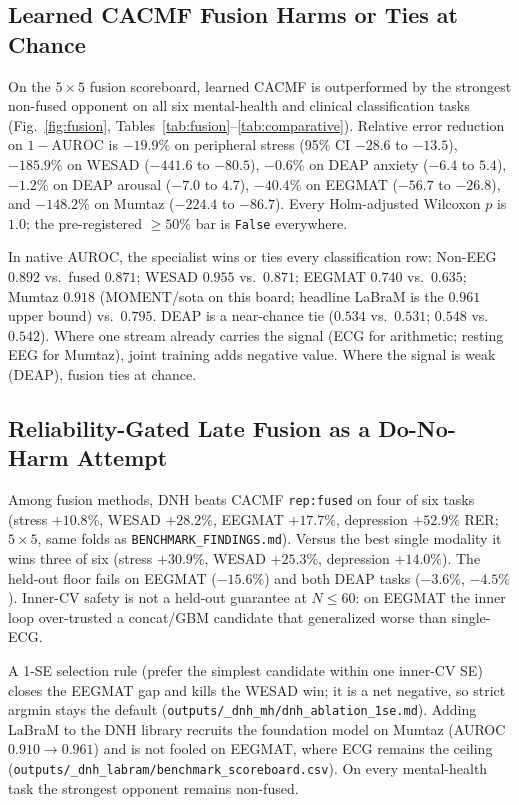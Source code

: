 \subsection{Learned CACMF Fusion Harms or Ties at Chance}
\label{subsec:ablation}

On the $5\times5$ fusion scoreboard, learned CACMF is outperformed by the strongest non-fused
opponent on all six mental-health and clinical classification tasks
(Fig.~\ref{fig:fusion}, Tables~\ref{tab:fusion}--\ref{tab:comparative}). Relative error reduction
on $1-\mathrm{AUROC}$ is $-19.9\%$ on peripheral stress (95\% CI $-28.6$ to $-13.5$),
$-185.9\%$ on WESAD ($-441.6$ to $-80.5$), $-0.6\%$ on DEAP anxiety ($-6.4$ to $5.4$),
$-1.2\%$ on DEAP arousal ($-7.0$ to $4.7$), $-40.4\%$ on EEGMAT ($-56.7$ to $-26.8$), and
$-148.2\%$ on Mumtaz ($-224.4$ to $-86.7$). Every Holm-adjusted Wilcoxon $p$ is $1.0$; the
pre-registered $\ge 50\%$ bar is \texttt{False} everywhere.

In native AUROC, the specialist wins or ties every classification row: Non-EEG $0.892$ vs.\ fused
$0.871$; WESAD $0.955$ vs.\ $0.871$; EEGMAT $0.740$ vs.\ $0.635$; Mumtaz $0.918$ (MOMENT/sota on
this board; headline LaBraM is the $0.961$ upper bound) vs.\ $0.795$. DEAP is a near-chance tie
($0.534$ vs.\ $0.531$; $0.548$ vs.\ $0.542$). Where one stream already carries the signal (ECG
for arithmetic; resting EEG for Mumtaz), joint training adds negative value. Where the signal is
weak (DEAP), fusion ties at chance.

\subsection{Reliability-Gated Late Fusion as a Do-No-Harm Attempt}
\label{subsec:dnh}

Among fusion methods, DNH beats CACMF \texttt{rep:fused} on four of six tasks (stress $+10.8\%$,
WESAD $+28.2\%$, EEGMAT $+17.7\%$, depression $+52.9\%$ RER; $5\times5$, same folds as
\texttt{BENCHMARK\_FINDINGS.md}). Versus the best single modality it wins three of six (stress
$+30.9\%$, WESAD $+25.3\%$, depression $+14.0\%$). The held-out floor fails on EEGMAT
($-15.6\%$) and both DEAP tasks ($-3.6\%$, $-4.5\%$). Inner-CV safety is not a held-out
guarantee at $N\le 60$: on EEGMAT the inner loop over-trusted a concat/GBM candidate that
generalized worse than single-ECG.

A 1-SE selection rule (prefer the simplest candidate within one inner-CV SE) closes the EEGMAT
gap and kills the WESAD win; it is a net negative, so strict argmin stays the default
(\texttt{outputs/\_dnh\_mh/dnh\_ablation\_1se.md}). Adding LaBraM to the DNH library recruits the
foundation model on Mumtaz (AUROC $0.910\rightarrow 0.961$) and is not fooled on EEGMAT, where
ECG remains the ceiling (\texttt{outputs/\_dnh\_labram/benchmark\_scoreboard.csv}). On every
mental-health task the strongest opponent remains non-fused.
